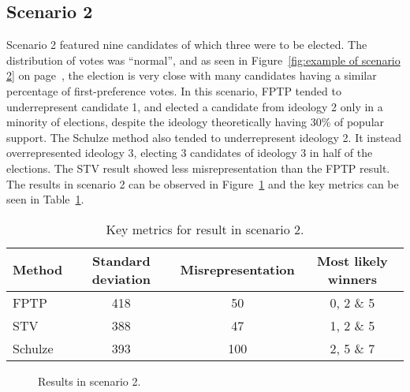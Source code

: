 \documentclass[12pt]{article}
\begin{document}
\subsection{Scenario 2}
\label{sec:resuls-scenario2}
Scenario 2 featured nine candidates of which three were to be elected. The distribution of votes was ``normal'', and as seen in Figure~\ref{fig:example of scenario 2} on page~\pageref{fig:example of scenario 2}, the election is very close with many candidates having a similar percentage of first-preference votes. In this scenario, FPTP tended to underrepresent candidate 1, and elected a candidate from ideology 2 only in a minority of elections, despite the ideology theoretically having 30\% of popular support. The Schulze method also tended to underrepresent ideology 2. It instead overrepresented ideology 3, electing 3 candidates of ideology 3 in half of the elections. The STV result showed less misrepresentation than the FPTP result. The results in scenario 2 can be observed in Figure~\ref{fig:scenario 2 result} and the key metrics can be seen in Table~\ref{tab:scenario 2 result}.
\begin{table}[H]
\centering
\caption{Key metrics for result in scenario 2.}
\label{tab:scenario 2 result}
\begin{tabular}{@{}lccc@{}}
\toprule
Method & Standard deviation & Misrepresentation & Most likely winners \\ \midrule
FPTP & 418 & 50 & 0, 2 \& 5 \\
STV & 388 & 47 & 1, 2 \& 5 \\
Schulze & 393 & 100 & 2, 5 \& 7  \\ \bottomrule
\end{tabular}
\end{table}
\begin{figure}[H]
	\centering
	\caption{Results in scenario 2.}
\label{fig:scenario 2 result}
\end{figure}
\end{document}
